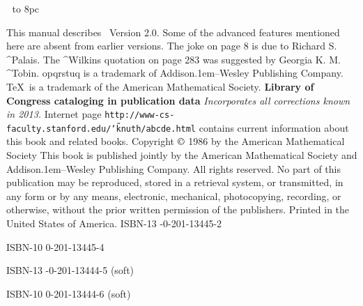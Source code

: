 \kern24pt
\eject
\titlepage
\eightpoint
\vbox to 8pc{}
\noindent\strut
This manual describes \MF\ Version 2.0. Some
of the advanced features mentioned here are absent from earlier versions.
\medskip
\noindent
The joke on page 8 is due to Richard S. ^{Palais}.
\medskip
\noindent
The ^{Wilkins} quotation on page 283 was suggested by Georgia K. M. ^{Tobin}.
\medskip
\noindent
{\manual opqrstuq} is a trademark of Addison\kern.1em--Wesley
 Publishing Company.
\medskip
\noindent
\TeX\ is a trademark of the American Mathematical Society.
\bigskip\medskip
\noindent
{\bf Library of Congress cataloging in publication data}
\medskip
{\tt{}}
\vfill
\noindent
{\sl \kern-1pt Incorporates all corrections known in 2013.}
\smallskip
\noindent
Internet page {\tt http://www-cs-faculty.stanford.edu/\char`\~
  knuth/abcde.html}
contains current information about this book and related books.
\smallskip
\noindent
Copyright $\copyright$ 1986 by the American Mathematical Society
\smallskip
\noindent
This book is published jointly by the American Mathematical Society
and Addison\kern.1em--Wesley Publishing Company.
All rights reserved. No part of this publication may be reproduced, stored in
a retrieval system, or transmitted, in any form or by any means,
electronic, mechanical, photocopying, recording, or otherwise, without
the prior written permission of the publishers. Printed in the United
States of America. %
\medskip
\noindent
ISBN-13 -0-201-13445-2\par\noindent
ISBN-10 \enspace\phantom{978-}0-201-13445-4\par\noindent
ISBN-13 -0-201-13444-5 (soft)\par\noindent
ISBN-10 \enspace\phantom{978-}0-201-13444-6 (soft)\par
